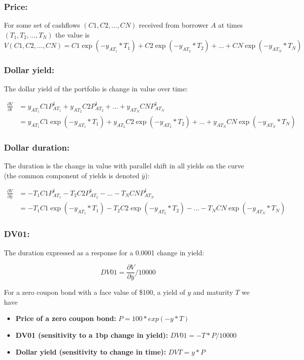 \subsubsection*{Price:} For some set of cashflows  $(C1, C2,\ldots ,CN)$ received from borrower $A$ at times  $(T_1, T_2,\ldots ,T_N)$ the value is 
\[V(C1, C2,\ldots ,CN) = C1\exp(-y_{AT_1}*T_1) + C2\exp(-y_{AT_2}*T_2) +  \ldots + CN\exp(-y_{AT_N}*T_N)\]

\subsubsection*{Dollar yield:} The dollar yield of the portfolio is change in value over time:

\begin{eqnarray*}
\frac{\partial V}{\partial t} &= y_{AT_1}C1P_{AT_1}^1 + y_{AT_2}C2P_{AT_2}^1+  \ldots + y_{AT_N}CNP_{AT_N}^1 \\
 &= y_{AT_1}C1\exp(-y_{AT_1}*T_1) + y_{AT_2}C2\exp(-y_{AT_2}*T_2) +  \ldots + y_{AT_N}CN\exp(-y_{AT_N}*T_N)
\end{eqnarray*}

\subsubsection*{Dollar duration:} The duration is the change in value with parallel shift in all yields on the curve (the common component of yields is denoted $\bar{y}$):

\begin{eqnarray*}
\frac{\partial V}{\partial \bar{y}} &= -T_1C1P_{AT_1}^1 - T_2C2P_{AT_2}^1 -  \ldots - T_NCNP_{AT_N}^1\\
 &=   -T_1C1\exp(-y_{AT_1}*T_1) - T_2C2\exp(-y_{AT_2}*T_2) -  \ldots - T_NCN\exp(-y_{AT_N}*T_N)
\end{eqnarray*}

\subsubsection*{DV01:} The duration expressed as a response for a 0.0001 change in yield:

\[ DV01 =  \frac{\partial V}{\partial \bar{y}}/10000\]

For a zero coupon bond with a face value of \$100, a yield of $y$ and maturity $T$ we have

\begin{itemize}
\item[] \textbf{Price of a zero coupon bond:} $P = 100*exp(-y*T)$\\
\item[] \textbf{DV01 (sensitivity to a 1bp change in yield):} $DV01 = -T*P/10000$\\
\item[] \textbf{Dollar yield (sensitivity to change in time):} $DVT = y*P$
\end{itemize}


